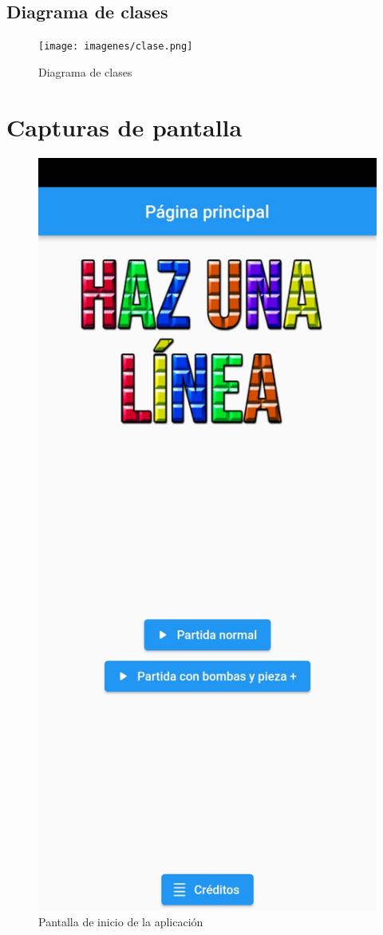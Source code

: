 \documentclass{article}
\begin{document}
\subsection{Diagrama de clases}
\begin{figure}[H]
        \texttt{[image: imagenes/clase.png]}
        \caption{Diagrama de clases}
\end{figure}

\section{Capturas de pantalla}
\begin{figure}[H]
\center
        \includegraphics[scale=0.28]{imagenes/captura7.jpeg}
        \caption{Pantalla de inicio de la aplicación}
\end{figure}
\end{document}
